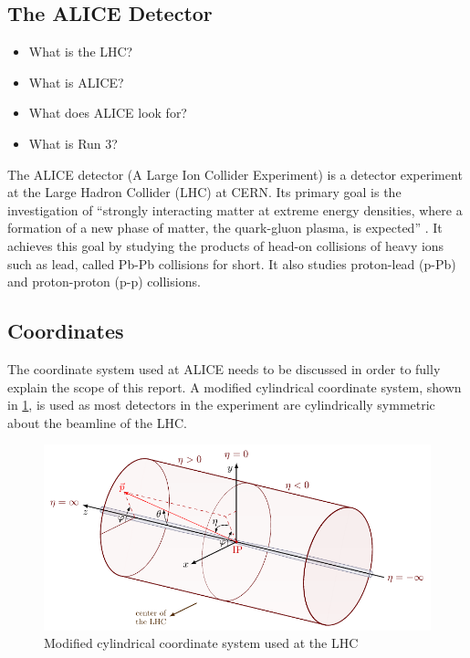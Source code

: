 \subsection{The ALICE Detector}
\begin{itemize}
    \item What is the LHC?
    \item What is ALICE?
    \item What does ALICE look for?
    \item What is Run 3?
\end{itemize}
The ALICE detector (A Large Ion Collider Experiment) is a detector experiment at the Large Hadron Collider (LHC) at CERN. Its primary goal is the investigation of ``strongly interacting matter at extreme energy densities, where a formation of a new phase of matter, the quark-gluon plasma, is expected'' \cite{ALICE_LOI}. It achieves this goal by studying the products of head-on collisions of heavy ions such as lead, called Pb-Pb collisions for short. It also studies proton-lead (p-Pb) and proton-proton (p-p) collisions.  



\subsection{Coordinates}
The coordinate system used at ALICE needs to be discussed in order to fully explain the scope of this report. A modified cylindrical coordinate system, shown in \cref{fig:coords}, is used as most detectors in the experiment are cylindrically symmetric about the beamline of the LHC. 

\begin{figure}[h]
    \begin{center}
        \includegraphics[width=.8\textwidth]{Figs/coords.pdf}
        \caption{Modified cylindrical coordinate system used at the LHC \cite{coords}}
        \label{fig:coords}
    \end{center}
\end{figure}

